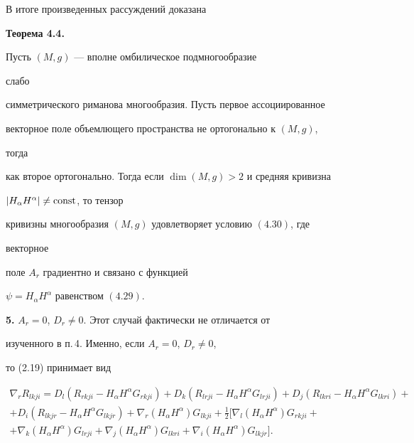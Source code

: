 В итоге произведенных рассуждений доказана


\medskip





{\bf Теорема 4.4.} {\it


Пусть $(M,g)$ --- вполне омбилическое подмногообразие


слабо


симметрического риманова многообразия. Пусть первое ассоциированное


векторное поле объемлющего пространства не ортогонально к $(M,g)$,


тогда


как второе ортогонально. Тогда если $\dim(M,g)>2$ и средняя кривизна


$|H_\alpha H^\alpha|\ne\operatorname{const}$, то тензор


кривизны многообразия $(M,g)$ удовлетворяет условию $(4.30)$, где


векторное


поле $A_r$ градиентно и связано с функцией


$\psi=H_\alpha H^\alpha$ равенством $(4.29)$.


}


\medskip





{\bf 5.} $A_r=0$, $D_r\ne 0$. Этот случай фактически не отличается от


изученного в п.\,4. Именно, если $A_r=0$, $D_r\ne 0$,


то (2.19) принимает вид


\begin{multline}


\nabla_r R_{lkji}=D_l(R_{rkji}-H_\alpha H^\alpha


G_{rkji})+


D_k(R_{lrji}-H_\alpha H^\alpha G_{lrji})+


D_j(R_{lkri}-H_\alpha H^\alpha G_{lkri})+ \\


+ D_i(R_{lkjr}-H_\alpha H^\alpha G_{lkjr})+ 


\nabla_r(H_\alpha H^\alpha)G_{lkji}+\tfrac{1}{2}[


\nabla_l(H_\alpha H^\alpha)G_{rkji}+ \\


+\nabla_k(H_\alpha H^\alpha)G_{lrji}+


\nabla_j(H_\alpha H^\alpha)G_{lkri}+


\nabla_i(H_\alpha H^\alpha)G_{lkjr}].


\tag{5.1}


\end{multline}


